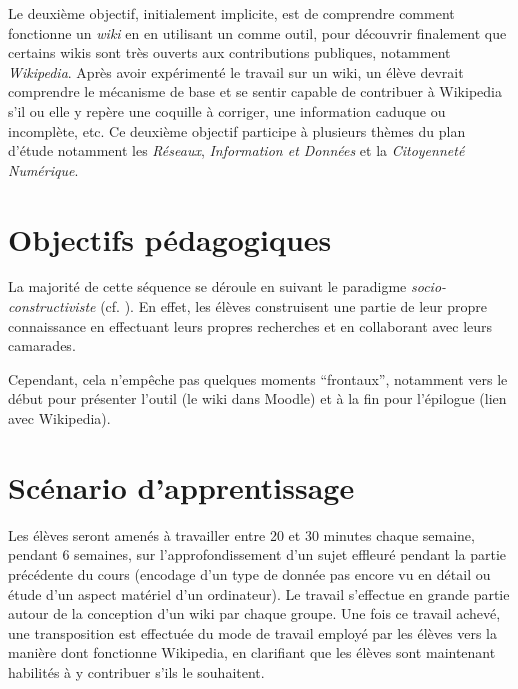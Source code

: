 \documentclass[11pt,bibliography=totoc]{scrartcl}
\begin{document}
Le deuxième objectif, initialement implicite, est de comprendre comment
fonctionne un \textit{wiki} en en utilisant un comme outil, pour découvrir
finalement que certains wikis sont très ouverts aux contributions publiques,
notamment \textit{Wikipedia}. Après avoir expérimenté le travail sur un wiki, un
élève devrait comprendre le mécanisme de base et se sentir capable de contribuer
à Wikipedia s'il ou elle y repère une coquille à corriger, une information
caduque ou incomplète, etc. Ce deuxième objectif participe à plusieurs thèmes du
plan d'étude notamment les \textit{Réseaux}, \textit{Information et Données} et
la \textit{Citoyenneté Numérique}.

\section{Objectifs pédagogiques}
La majorité de cette séquence se déroule en suivant le paradigme
\textit{socio-constructiviste} (cf. \cite{kozanitis}). En effet, les élèves
construisent une partie de leur propre connaissance en effectuant leurs propres
recherches et en collaborant avec leurs camarades.

Cependant, cela n'empêche pas quelques moments ``frontaux'', notamment vers le
début pour présenter l'outil (le wiki dans Moodle) et à la fin pour l'épilogue
(lien avec Wikipedia).

\section{Scénario d'apprentissage}
Les élèves seront amenés à travailler entre 20 et 30 minutes chaque semaine,
pendant 6 semaines, sur l'approfondissement d'un sujet effleuré pendant la
partie précédente du cours (encodage d'un type de donnée pas encore vu en détail
ou étude d'un aspect matériel d'un ordinateur). Le travail s'effectue en grande
partie autour de la conception d'un wiki par chaque groupe. Une fois ce travail
achevé, une transposition est effectuée du mode de travail employé par les
élèves vers la manière dont fonctionne Wikipedia, en clarifiant que les élèves
sont maintenant habilités à y contribuer s'ils le souhaitent.
\end{document}
